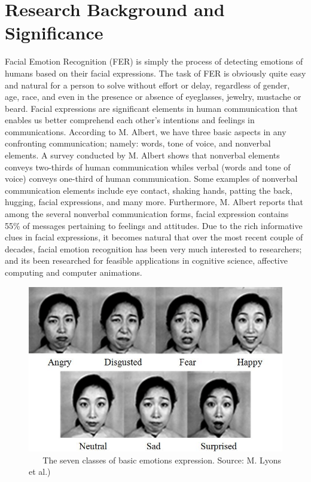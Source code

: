 \documentclass[master]{thesis-uestc}
\begin{document}
\section{Research Background and Significance}
Facial Emotion Recognition (FER) is simply the process of detecting emotions of humans based on their facial expressions. The task of FER is obviously quite easy and natural for a person to solve without effort or delay, regardless of gender, age, race, and even in the presence or absence of eyeglasses, jewelry, mustache or beard\cite{Ivanovsky-2017}. Facial expressions are significant elements in human communication that enables us better comprehend each other's intentions and feelings in communications. According to M. Albert\cite{albert1968}, we have three basic aspects in any confronting communication; namely: words, tone of voice, and nonverbal elements. A survey conducted by M. Albert\cite{albert1968} shows that nonverbal elements conveys two-thirds of human communication whiles verbal (words and tone of voice) conveys one-third of human communication. Some examples of nonverbal communication elements include eye contact, shaking hands, patting the back, hugging, facial expressions, and many more. Furthermore, M. Albert\cite{albert1968} reports that among the several nonverbal communication forms, facial expression contains 55\% of messages pertaining to feelings and attitudes. Due to the rich informative clues in facial expressions, it becomes natural that over the most recent couple of decades, facial emotion recognition has been very much interested to researchers; and its been researched for feasible applications in cognitive science, affective computing and computer animations.

\begin{figure}[ht]
\includegraphics[width=5in]{pic/7_basic_emotions.png}
\caption{\,\,\,\,\,\,\,\,\,\,The seven classes of basic emotions expression. Source: M. Lyons et al.\cite{Michael-2017})}
\label{7_basic_emotions}
\end{figure}
\end{document}
